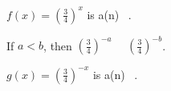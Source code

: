\documentclass{ximera}
\begin{document}
\begin{example}
\begin{question}
$f(x) = \left( \frac{3}{4} \right)^{x}$  is a(n) \,  .  \\



\end{question}




















\begin{question}



If $a < b$, then $\left( \frac{3}{4} \right)^{-a}$ \, \wordChoice{\choice[correct]{$<$} \choice{$>$}} \, $\left( \frac{3}{4} \right)^{-b}$.  \\



\end{question}





\begin{question}



$g(x) = \left( \frac{3}{4} \right)^{-x}$  is a(n) \,  .  \\



\end{question}








\end{example}
\end{document}
